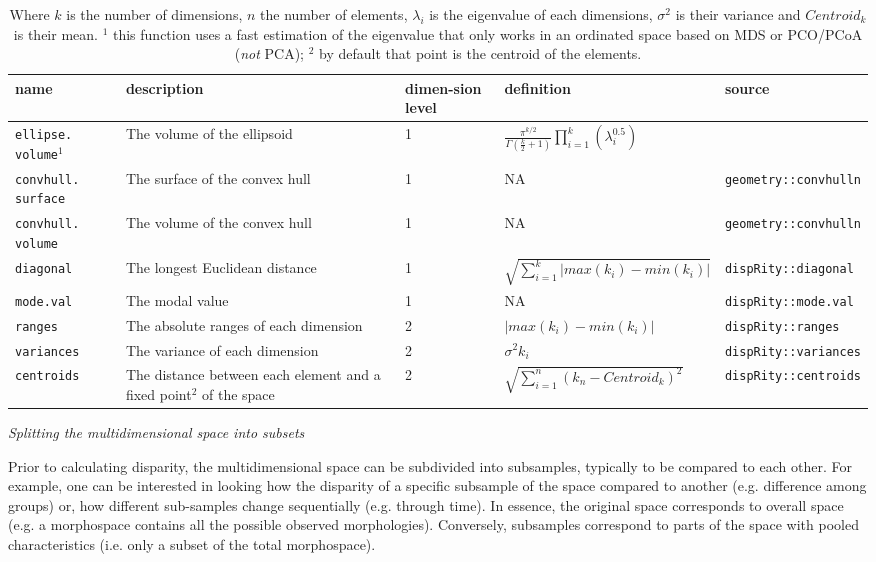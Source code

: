 \documentclass[12pt,letterpaper]{article}
\renewcommand{\subsection}[1]{%
\bigskip
\begin{center}
\begin{large}
\normalfont\itshape #1
\end{large}
\end{center}}
\begin{document}
\begin{table}
\resizebox{\textwidth}{!}
{%
    \begin{tabular}{p{2cm}|p{5cm}|p{1cm}|p{5cm}|p{5cm}}
        name & description & dimen-sion level & definition & source \\
        \hline
        \texttt{ellipse. volume}$^1$ & The volume of the ellipsoid & 1 & $\frac{\pi^{k/2}}{\Gamma(\frac{k}{2}+1)}\displaystyle\prod_{i=1}^{k} (\lambda_{i}^{0.5})$ & \cite{DonohueDim}\\
        \texttt{convhull. surface} & The surface of the convex hull & 1 & NA & \texttt{geometry::convhulln} \\
        \texttt{convhull. volume} & The volume of the convex hull & 1 & NA & \texttt{geometry::convhulln} \\
        \texttt{diagonal} & The longest Euclidean distance & 1 & $\sqrt{\sum_{i=1}^{k}|max(k_i) - min(k_i)|}$ & \texttt{dispRity::diagonal} \\
        \texttt{mode.val} & The modal value & 1 & NA & \texttt{dispRity::mode.val}\\
        \texttt{ranges} & The absolute ranges of each dimension & 2 & $|max(k_i) - min(k_i)|$ & \texttt{dispRity::ranges} \\
        \texttt{variances} & The variance of each dimension & 2 & $\sigma^{2}{k_i}$ & \texttt{dispRity::variances} \\
        \texttt{centroids} & The distance between each element and a fixed point$^2$ of the space & 2 & $\sqrt{\sum_{i=1}^{n}{({k}_{n}-Centroid_{k})^2}}$ & \texttt{dispRity::centroids} \\
    \end{tabular}
}%
    \caption{\small{Where $k$ is the number of dimensions, $n$ the number of elements, $\lambda_i$ is the eigenvalue of each dimensions, $\sigma^{2}$ is their variance and $Centroid_{k}$ is their mean. $^1$ this function uses a fast estimation of the eigenvalue that only works in an ordinated space based on MDS or PCO/PCoA (\textit{not} PCA); $^2$ by default that point is the centroid of the elements.}}
    \label{Tab:metrics}
\end{table}





\subsection{Splitting the multidimensional space into subsets}
Prior to calculating disparity, the multidimensional space can be subdivided into subsamples, typically to be compared to each other.
For example, one can be interested in looking how the disparity of a specific subsample of the space compared to another (e.g. difference among groups) or, how different sub-samples change sequentially (e.g. through time).
In essence, the original space corresponds to overall space (e.g. a morphospace contains all the possible observed morphologies).
Conversely, subsamples correspond to parts of the space with pooled characteristics (i.e. only a subset of the total morphospace).
\end{document}
